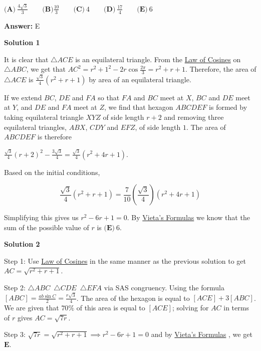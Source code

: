 \begin{enumerate}
 $\textbf{(A)}\ \frac{4\sqrt{3}}{3} \qquad \textbf{(B)} \frac{10}{3} \qquad \textbf{(C)}\ 4 \qquad \textbf{(D)}\ \frac{17}{4} \qquad \textbf{(E)}\ 6$

 \textbf{Answer: }E



\textbf{Solution 1}

It is clear that $\triangle ACE$ is an equilateral triangle. From the \href{https://artofproblemsolving.com/wiki/index.php?title=Law\_of\_Cosines}{Law of Cosines} on $\triangle ABC$, we get that $AC^2 = r^2+1^2-2r\cos{\frac{2\pi}{3}} = r^2+r+1$. Therefore, the area of $\triangle ACE$ is $\frac{\sqrt{3}}{4}(r^2+r+1)$ by area of an equilateral triangle.

 If we extend $BC$, $DE$ and $FA$ so that $FA$ and $BC$ meet at $X$, $BC$ and $DE$ meet at $Y$, and $DE$ and $FA$ meet at $Z$, we find that hexagon $ABCDEF$ is formed by taking equilateral triangle $XYZ$ of side length $r+2$ and removing three equilateral triangles, $ABX$, $CDY$ and $EFZ$, of side length $1$. The area of $ABCDEF$ is therefore

 $\frac{\sqrt{3}}{4}(r+2)^2-\frac{3\sqrt{3}}{4} = \frac{\sqrt{3}}{4}(r^2+4r+1)$.

 
Based on the initial conditions,

 
 \[\frac{\sqrt{3}}{4}(r^2+r+1) = \frac{7}{10}\left(\frac{\sqrt{3}}{4}\right)(r^2+4r+1)\]

 Simplifying this gives us $r^2-6r+1 = 0$. By \href{https://artofproblemsolving.com/wiki/index.php?title=Vieta\%27s\_Formulas}{Vieta's Formulas} we know that the sum of the possible value of $r$ is $\boxed{\textbf{(E)}\ 6}$.

 



\textbf{Solution 2}

Step 1: Use \href{https://artofproblemsolving.com/wiki/index.php?title=Law\_of\_Cosines}{Law of Cosines} in the same manner as the previous solution to get $AC=\sqrt{r^2+r+1}$. 

 Step 2: $\triangle{ABC}$~$\triangle{CDE}$~$\triangle{EFA}$ via SAS congruency. Using the formula $[ABC]=\frac{ab \sin C}{2}= \frac{r \sqrt{3}}{4}$. The area of the hexagon is equal to $[ACE] + 3[ABC]$. We are given that $70\%$ of this area is equal to $[ACE]$; solving for $AC$ in terms of $r$ gives $AC=\sqrt{7r}$.

 Step 3: $\sqrt{7r}=\sqrt{r^2+r+1} \implies r^2-6r+1=0$ and by \href{https://artofproblemsolving.com/wiki/index.php?title=Vieta\%27s\_Formulas}{Vieta's Formulas} , we get $\boxed{\textbf{E}}$.


\end{enumerate}
